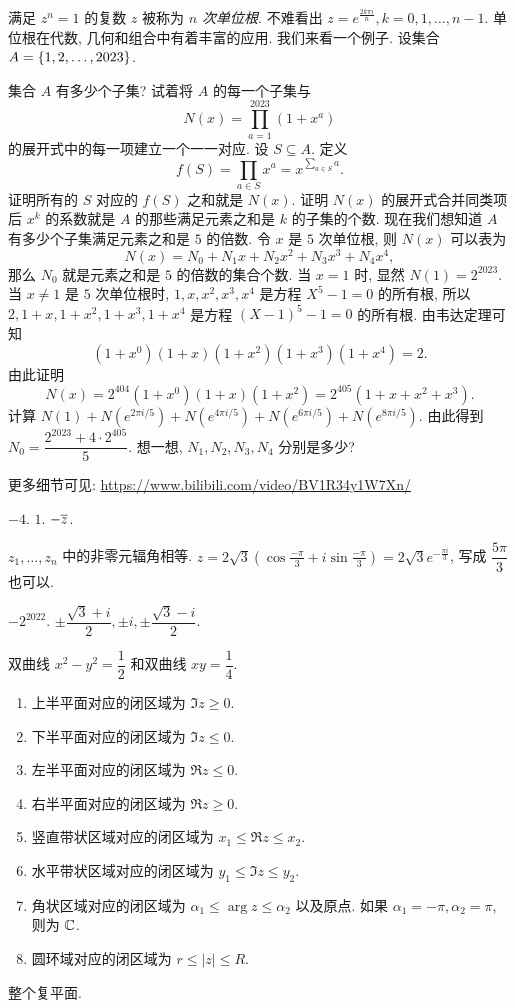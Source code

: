 \begin{homework}
\begin{exlist}
    \item 满足 $z^n=1$ 的复数 $z$ 被称为 \emph{$n$ 次单位根}.
      不难看出 $z=e^{\frac{2k\pi i}n},k=0,1,\dots,n-1$.
      单位根在代数, 几何和组合中有着丰富的应用. 我们来看一个例子.
      设集合 $A={\left\{1,2,\dots,2023\right\}}$.
      \begin{tasks}
        \task 集合 $A$ 有多少个子集? 试着将 $A$ 的每一个子集与
        \[N(x)=\prod_{a=1}^{2023}(1+x^a)\]
        的展开式中的每一项建立一个一一对应.
        \task 设 $S\subseteq A$. 定义
        \[f(S)=\prod_{a\in S}x^a=x^{\sum_{a\in S}a}.\]
        证明所有的 $S$ 对应的 $f(S)$ 之和就是 $N(x)$.
        \task 证明 $N(x)$ 的展开式合并同类项后 $x^k$ 的系数就是 $A$ 的那些满足元素之和是 $k$ 的子集的个数.
        \task 现在我们想知道 $A$ 有多少个子集满足元素之和是 $5$ 的倍数.
      令 $x$ 是 $5$ 次单位根, 则 $N(x)$ 可以表为
      \[N(x)=N_0+N_1x+N_2x^2+N_3x^3+N_4x^4,\]
        那么 $N_0$ 就是元素之和是 $5$ 的倍数的集合个数.
        \task 当 $x=1$ 时, 显然 $N(1)=2^{2023}$.
        当 $x\neq 1$ 是 $5$ 次单位根时, $1,x,x^2,x^3,x^4$ 是方程 $X^5-1=0$ 的所有根, 所以 $2,1+x,1+x^2,1+x^3,1+x^4$ 是方程 $(X-1)^5-1=0$ 的所有根. 由韦达定理可知
        \[(1+x^0)(1+x)(1+x^2)(1+x^3)(1+x^4)=2.\]
        由此证明
        \[N(x)=2^{404}(1+x^0)(1+x)(1+x^2)=2^{405}(1+x+x^2+x^3).\]
        \task 计算 $N(1)+N(e^{2\pi i/5})+N(e^{4\pi i/5})+N(e^{6\pi i/5})+N(e^{8\pi i/5})$. 由此得到 $N_0=\dfrac{2^{2023}+4\cdot 2^{405}}5$.
        \task 想一想, $N_1,N_2,N_3,N_4$ 分别是多少?
      \end{tasks}
      更多细节可见: \url{https://www.bilibili.com/video/BV1R34y1W7Xn/}
  \end{exlist}  
\end{homework}

\exerciseanswer

 $-4$.
 $1$.
 $-\overline z$.

 $z_1,\dots,z_n$ 中的非零元辐角相等.
 $\displaystyle z=2\sqrt3\left(\cos\frac{-\pi}3+i\sin\frac{-\pi}3\right)=2\sqrt3e^{-\frac{\pi i}3}$, 写成 $\dfrac{5\pi}3$ 也可以.

 $-2^{2022}$.
 $\pm\dfrac{\sqrt3+i}2,\pm i,\pm\dfrac{\sqrt3-i}2$.

 双曲线 $x^2-y^2=\dfrac12$ 和双曲线 $xy=\dfrac14$.
\begin{enumerate}
	\item 上半平面对应的闭区域为 $\Im z\ge0$.
	\item 下半平面对应的闭区域为 $\Im z\le0$.
	\item 左半平面对应的闭区域为 $\Re z\le0$.
	\item 右半平面对应的闭区域为 $\Re z\ge0$.
	\item 竖直带状区域对应的闭区域为 $x_1\le\Re z\le x_2$.
	\item 水平带状区域对应的闭区域为 $y_1\le\Im z\le y_2$.
	\item 角状区域对应的闭区域为 $\alpha_1\le \arg z\le \alpha_2$ 以及原点. 如果 $\alpha_1=-\pi,\alpha_2=\pi$, 则为 ${\mathbb{C}}$.
	\item 圆环域对应的闭区域为 $r\le|z|\le R$.
\end{enumerate}
 整个复平面.

